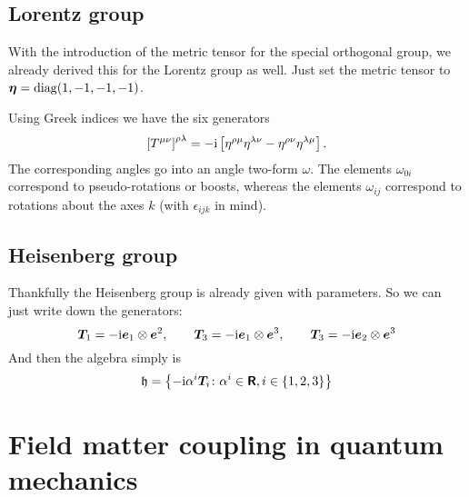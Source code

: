 \documentclass[11pt, english, fleqn, DIV=15, headinclude, BCOR=1cm]{scrartcl}
\begin{document}
\subsection{Lorentz group}

With the introduction of the metric tensor for the special orthogonal group, we
already derived this for the Lorentz group as well. Just set the metric tensor
to $\mat\eta = \diag(1, -1, -1, -1)$.

Using Greek indices we have the six generators
\[
    \left[ T^{\mu\nu} \right]^{\rho\lambda} = - \mathrm i \left[ 
        \eta^{\rho\mu} \eta^{\lambda\nu} - \eta^{\rho\nu} \eta^{\lambda\mu}
     \right].
\]
The corresponding angles go into an angle two-form $\omega$. The elements
$\omega_{0i}$ correspond to pseudo-rotations or boosts, whereas the elements
$\omega_{ij}$ correspond to rotations about the axes $k$ (with $\epsilon_{ijk}$
in mind).

\subsection{Heisenberg group}

Thankfully the Heisenberg group is already given with parameters. So we can
just write down the generators:
\[
    \mat T_1 = - \iup \ev_1 \otimes \ev^2
    \eqnsep
    \mat T_3 = - \iup \ev_1 \otimes \ev^3
    \eqnsep
    \mat T_3 = - \iup \ev_2 \otimes \ev^3
\]
And then the algebra simply is
\[
    \mathfrak h =
    \cbr{
        - \iup \alpha^{i} \mat T_i
        \colon
        \alpha^i \in \R, i \in \{ 1, 2, 3 \}
    }
\]


\section{Field matter coupling in quantum mechanics}
\label{homework:2}
\end{document}
